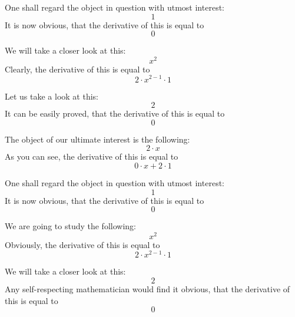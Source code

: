 \documentclass{article}
\begin{document}
One shall regard the object in question with utmost interest:
\begin{equation}
1 
\end{equation}
It is now obvious, that the derivative of this is equal to
\begin{equation}
0 
\end{equation}

We will take a closer look at this:
\begin{equation}
x ^{2 } 
\end{equation}
Clearly, the derivative of this is equal to
\begin{equation}
2 \cdot x ^{2 - 1 } \cdot 1 
\end{equation}

Let us take a look at this:
\begin{equation}
2 
\end{equation}
It can be easily proved, that the derivative of this is equal to
\begin{equation}
0 
\end{equation}

The object of our ultimate interest is the following:
\begin{equation}
2 \cdot x 
\end{equation}
As you can see, the derivative of this is equal to
\begin{equation}
0 \cdot x + 2 \cdot 1 
\end{equation}

One shall regard the object in question with utmost interest:
\begin{equation}
1 
\end{equation}
It is now obvious, that the derivative of this is equal to
\begin{equation}
0 
\end{equation}

We are going to study the following:
\begin{equation}
x ^{2 } 
\end{equation}
Obviously, the derivative of this is equal to
\begin{equation}
2 \cdot x ^{2 - 1 } \cdot 1 
\end{equation}

We will take a closer look at this:
\begin{equation}
2 
\end{equation}
Any self-respecting mathematician would find it obvious, that the derivative of this is equal to
\begin{equation}
0 
\end{equation}
\end{document}
